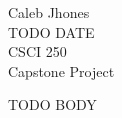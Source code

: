 \documentclass[12pt] {article}
\begin{document}
\noindent{}Caleb Jhones \\
\noindent{}TODO DATE\\
\noindent{}CSCI 250\\
\noindent{}Capstone Project\\

\setlength\parindent{0.5in} %

TODO BODY
\end{document}
